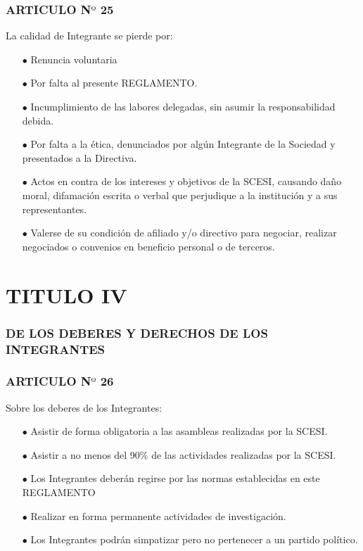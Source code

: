 \documentclass[11pt,letterpaper]{book}
\begin{document}
\subsubsection*{ARTICULO N$º$ 25}
La calidad de Integrante se pierde por:
\begin{itemize}
\item[$\bullet$] Renuncia voluntaria 
\item[$\bullet$] Por falta al presente REGLAMENTO. 
\item[$\bullet$] Incumplimiento de las labores delegadas, sin asumir la responsabilidad debida. 
\item[$\bullet$] Por falta a la ética, denunciados por algún Integrante de la Sociedad y presentados a la Directiva. 
\item[$\bullet$] Actos en contra de los intereses y objetivos de la SCESI, causando daño moral, difamación escrita o verbal que perjudique a la institución y a sus representantes. 
\item[$\bullet$]Valerse de su condición de afiliado y/o directivo para negociar, realizar negociados o convenios en beneficio personal o de terceros. 
\end{itemize}
\newpage
\section*{TITULO IV}
\subsubsection*{DE LOS DEBERES Y DERECHOS DE LOS INTEGRANTES}
\subsubsection*{ARTICULO N$º$ 26}
Sobre los deberes de los Integrantes:
\begin{itemize}
\item[$\bullet$] Asistir de forma obligatoria a las asambleas realizadas por la SCESI. 
\item[$\bullet$] Asistir a no menos del 90\% de las actividades realizadas por la SCESI. 
\item[$\bullet$] Los Integrantes deberán regirse por las normas establecidas en este REGLAMENTO 
\item[$\bullet$] Realizar en forma permanente actividades de investigación. 
\item[$\bullet$] Los Integrantes podrán simpatizar pero no pertenecer a un partido político.
\end{itemize}
\end{document}
